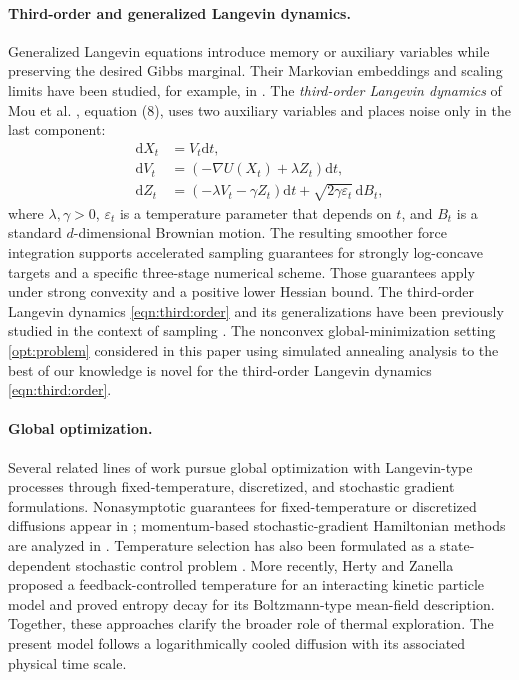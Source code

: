 \documentclass[11pt]{article}
\theoremstyle{definition}
\newcommand{\dd}{\mathrm d}
\newcommand{\eps}{\varepsilon}
\begin{document}
\paragraph{Third-order and generalized Langevin dynamics.}
Generalized Langevin equations introduce memory or auxiliary variables while
preserving the desired Gibbs marginal. Their Markovian embeddings and scaling
limits have been studied, for example, in
\cite{OttobrePavliotis2011,PavliotisStoltzVaes2021}. The \textit{third-order Langevin dynamics} of
Mou et al. \cite{MouEtAl2021}, equation (8), uses two auxiliary variables and places
noise only in the last component:  
\begin{equation}\label{eqn:third:order}
\begin{aligned}
 \dd X_t&=V_t\dd t,\\
 \dd V_t&=(-\nabla U(X_t)+\lambda Z_t)\dd t,\\
 \dd Z_t&=(-\lambda V_t-\gamma Z_t)\dd t
                 +\sqrt{2\gamma\eps_t}\,\dd B_t,
\end{aligned}
\end{equation}
where $\lambda,\gamma>0$, $\varepsilon_{t}$ is a temperature parameter
that depends on $t$, and 
$B_{t}$ is a standard $d$-dimensional Brownian motion.
The resulting smoother force integration supports
accelerated sampling guarantees for strongly log-concave targets and a specific
three-stage numerical scheme. Those guarantees apply under strong convexity and a
positive lower Hessian bound. The third-order Langevin dynamics \eqref{eqn:third:order} 
and its generalizations have been previously studied in the context
of sampling \cite{MouEtAl2021,DangGurbuzbalabanIslamYaoZhu2025,high-order-Liu-2025}. 
The nonconvex global-minimization setting \eqref{opt:problem} considered
in this paper using simulated annealing analysis to the best of our knowledge is novel
for the third-order Langevin dynamics \eqref{eqn:third:order}.

\paragraph{Global optimization.}
Several related lines of work pursue global optimization with Langevin-type
processes through fixed-temperature, discretized, and stochastic gradient
formulations.
Nonasymptotic guarantees for fixed-temperature or discretized diffusions appear in
\cite{RaginskyRakhlinTelgarsky2017,ErdogduMackeyShamir2018,xu2018global,Chau2019,Zhang2019}; momentum-based
stochastic-gradient Hamiltonian methods are analyzed in
\cite{GaoGurbuzbalabanZhu2022,Chau2022}. Temperature selection has also been formulated as
a state-dependent stochastic control problem \cite{GaoXuZhou2022}. More recently,
Herty and Zanella \cite{HertyZanella2026} proposed a feedback-controlled temperature
for an interacting kinetic particle model and proved entropy decay for its
Boltzmann-type mean-field description. Together, these approaches clarify the
broader role of thermal exploration. The present model follows a logarithmically
cooled diffusion with its associated physical time scale.
\end{document}
